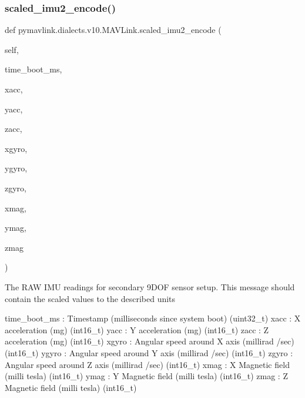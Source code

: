 \begin{DoxyVerb}
\begin{DoxyVerb}
\begin{DoxyVerb}
\begin{DoxyVerb}
\begin{DoxyVerb}
\begin{DoxyVerb}
\begin{DoxyVerb}
\begin{DoxyVerb}
\begin{DoxyVerb}
\begin{DoxyVerb}
\subsubsection{\texorpdfstring{scaled\+\_\+imu2\+\_\+encode()}{scaled\_imu2\_encode()}}
{\footnotesize\ttfamily def pymavlink.\+dialects.\+v10.\+M\+A\+V\+Link.\+scaled\+\_\+imu2\+\_\+encode (\begin{DoxyParamCaption}\item[{}]{self,  }\item[{}]{time\+\_\+boot\+\_\+ms,  }\item[{}]{xacc,  }\item[{}]{yacc,  }\item[{}]{zacc,  }\item[{}]{xgyro,  }\item[{}]{ygyro,  }\item[{}]{zgyro,  }\item[{}]{xmag,  }\item[{}]{ymag,  }\item[{}]{zmag }\end{DoxyParamCaption})}

\begin{DoxyVerb}The RAW IMU readings for secondary 9DOF sensor setup. This message
should contain the scaled values to the described
units

time_boot_ms              : Timestamp (milliseconds since system boot) (uint32_t)
xacc                      : X acceleration (mg) (int16_t)
yacc                      : Y acceleration (mg) (int16_t)
zacc                      : Z acceleration (mg) (int16_t)
xgyro                     : Angular speed around X axis (millirad /sec) (int16_t)
ygyro                     : Angular speed around Y axis (millirad /sec) (int16_t)
zgyro                     : Angular speed around Z axis (millirad /sec) (int16_t)
xmag                      : X Magnetic field (milli tesla) (int16_t)
ymag                      : Y Magnetic field (milli tesla) (int16_t)
zmag                      : Z Magnetic field (milli tesla) (int16_t)\end{DoxyVerb}
 \mbox{\label{classpymavlink_1_1dialects_1_1v10_1_1MAVLink_a8409dbaadf7858ccbcf6d36502b8e8c1}} 

\end{DoxyVerb}
\end{DoxyVerb}
\end{DoxyVerb}
\end{DoxyVerb}
\end{DoxyVerb}
\end{DoxyVerb}
\end{DoxyVerb}
\end{DoxyVerb}
\end{DoxyVerb}
\end{DoxyVerb}
